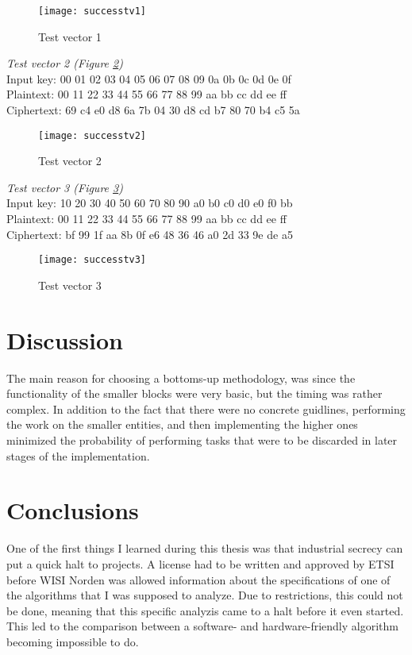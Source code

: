 \begin{figure}
  \texttt{[image: successtv1]}
  \caption{Test vector 1}
  \label{test:1}
\end{figure}

\emph{Test vector 2 (Figure \ref{test:2})}\\
Input key: 00 01 02 03 04 05 06 07 08 09 0a 0b 0c 0d 0e 0f\\
Plaintext: 00 11 22 33 44 55 66 77 88 99 aa bb cc dd ee ff\\
Ciphertext: 69 c4 e0 d8 6a 7b 04 30 d8 cd b7 80 70 b4 c5 5a

\begin{figure}
  \texttt{[image: successtv2]}
  \caption{Test vector 2}
  \label{test:2}
\end{figure}

\emph{Test vector 3 (Figure \ref{test:3})} \\
Input key: 10 20 30 40 50 60 70 80 90 a0 b0 c0 d0 e0 f0 bb\\
Plaintext: 00 11 22 33 44 55 66 77 88 99 aa bb cc dd ee ff\\
Ciphertext: bf 99 1f aa 8b 0f e6 48 36 46 a0 2d 33 9e de a5

\begin{figure}
  \texttt{[image: successtv3]}
  \caption{Test vector 3}
  \label{test:3}
\end{figure}

\section{Discussion}
The main reason for choosing a bottoms-up methodology, was since the 
functionality of the smaller blocks were very basic, but the timing was 
rather complex. In addition to the fact that there were no concrete 
guidlines, performing the work on the smaller entities, and then 
implementing the higher ones minimized the probability of performing 
tasks that were to be discarded in later stages of the implementation.

\section{Conclusions}
One of the first things I learned during this thesis was that industrial
secrecy can put a quick halt to projects. A license had to be written 
and approved by ETSI before WISI Norden was allowed information about 
the specifications of one of the algorithms that I was supposed to 
analyze. Due to restrictions, this could not be done, meaning that 
this specific analyzis came to a halt before it even started. This 
led to the comparison between a software- and hardware-friendly 
algorithm becoming impossible to do. 


